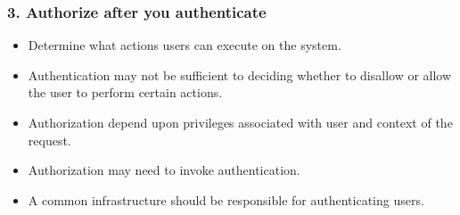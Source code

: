 \documentclass[12pt,norsk]{beamer}
\begin{document}
\begin{frame}

	\frametitle{3. Authorize after you authenticate}

	\begin{itemize}
		\item Determine what actions users can execute on the system.
		\item Authentication may not be sufficient to deciding whether to disallow or allow the user to perform certain actions. 
		\item Authorization depend upon privileges associated with user and context of the request.
		\item Authorization may need to invoke authentication.
		\item A common infrastructure should be responsible for authenticating users.
		
	\end{itemize}		

\end{frame}
\end{document}
